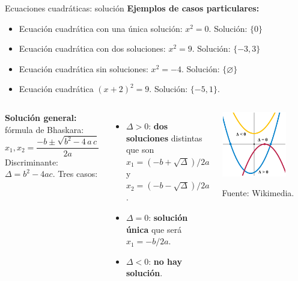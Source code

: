 \documentclass[9pt, aspectratio=169]{beamer}
\begin{document}
\begin{frame}{Ecuaciones cuadráticas: solución}
    \textbf{Ejemplos de casos particulares:}
\begin{multicols}{2}
\begin{itemize}
    \item Ecuación cuadrática con una única solución: $x^2 = 0$. Solución: $\{0\}$
    \item Ecuación cuadrática con dos soluciones: $x^2 = 9$. Solución: $\{-3, 3\}$
    \item Ecuación cuadrática sin soluciones: $x^2 = -4$. Solución: $\{ \varnothing \}$
    \item Ecuación cuadrática $(x+2)^2 = 9$. Solución: $\{-5, 1\}$.
\end{itemize}
\end{multicols}
\pause
\begin{columns}
\textbf{Solución general:} fórmula de Bhaskara:
\[ x_1, x_2 = \frac{-b \pm \sqrt{b^2 - 4\, a \, c}}{2a} \]
Discriminante: $\Delta = b^2 - 4 a c$. Tres casos:
\begin{itemize}
    \item $\Delta > 0$: \textbf{dos soluciones} distintas que son $x_1 = (-b + \sqrt{\Delta})/2a$ y $x_2 = (-b - \sqrt{\Delta})/2a$.
    \item $\Delta = 0$: \textbf{solución única} que será $x_1 = -b/2a$.
    \item $\Delta < 0$: \textbf{no hay solución}.
\end{itemize}
\begin{center}
    \includegraphics[width=0.75\textwidth]{figs/fig-01.png}
    
    {\tiny Fuente: Wikimedia.}
\end{center}
\end{columns}
\end{frame}
\end{document}
